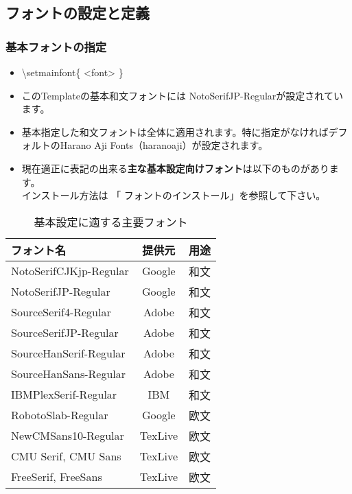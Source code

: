 \documentclass[a4paper,10pt]{ltjsarticle}
\def\colH#1{\color[HTML]{#1}}
\def\bs{\textbackslash }
\begin{document}
\subsection{フォントの設定と定義}

\subsubsection{基本フォントの指定}
\begin{itemize}
  \item[]\hspace{-5mm} {\colH{800000}\bs setmainfont\{ <font> \}}
  \item このTemplateの基本和文フォントには{\colH{800000} NotoSerifJP-Regular}が設定されています。
  \item 基本指定した和文フォントは全体に適用されます。特に指定がなければデフォルトのHarano Aji Fonts（haranoaji）が設定されます。
  \item 現在適正に表記の出来る\textbf{主な基本設定向けフォント}は以下のものがあります。\\
  インストール方法は 「{\fFSans{} フォントのインストール}」を参照して下さい。\vspace{-4mm}
\end{itemize}
\begin{table}[h]
\begin{center}
\begin{tabular}{l|c|l}
\textbf{フォント名} & \textbf{提供元} & \textbf{用途}\\
\hline
NotoSerifCJKjp-Regular & Google & 和文\\%
NotoSerifJP-Regular & Google & 和文\\%
SourceSerif4-Regular & Adobe & 和文\\%
SourceSerifJP-Regular & Adobe & 和文\\%
SourceHanSerif-Regular & Adobe & 和文\\%
SourceHanSans-Regular & Adobe & 和文\\%
IBMPlexSerif-Regular & IBM & 和文\\%
RobotoSlab-Regular & Google & 欧文\\%
NewCMSans10-Regular & TexLive & 欧文\\%
CMU Serif, CMU Sans & TexLive & 欧文\\%
FreeSerif, FreeSans & TexLive & 欧文\\%
\end{tabular}
\caption{基本設定に適する主要フォント}
\end{center}
\end{table}
\vspace{-6mm}
\end{document}

